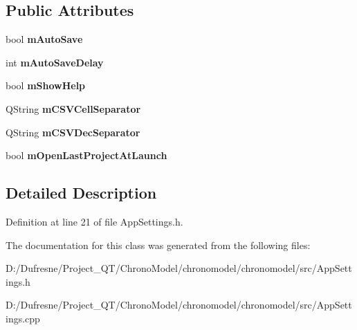 \subsection*{Public Attributes}
\begin{DoxyCompactItemize}
\item 
\hypertarget{class_app_settings_a34601f5b8a6e07a917e921245c207e21}{bool {\bfseries m\-Auto\-Save}}\label{class_app_settings_a34601f5b8a6e07a917e921245c207e21}

\item 
\hypertarget{class_app_settings_a32b8c1b9531b2c900bf53b9ee9daddb9}{int {\bfseries m\-Auto\-Save\-Delay}}\label{class_app_settings_a32b8c1b9531b2c900bf53b9ee9daddb9}

\item 
\hypertarget{class_app_settings_a5e0e34656a10ac3033f1c1024fbb42f9}{bool {\bfseries m\-Show\-Help}}\label{class_app_settings_a5e0e34656a10ac3033f1c1024fbb42f9}

\item 
\hypertarget{class_app_settings_a1bd0ecd508366a96991add8d87ed30ff}{Q\-String {\bfseries m\-C\-S\-V\-Cell\-Separator}}\label{class_app_settings_a1bd0ecd508366a96991add8d87ed30ff}

\item 
\hypertarget{class_app_settings_a311587646ae73730f453d4ee1d9c6df0}{Q\-String {\bfseries m\-C\-S\-V\-Dec\-Separator}}\label{class_app_settings_a311587646ae73730f453d4ee1d9c6df0}

\item 
\hypertarget{class_app_settings_a3c26dc616125e6a0a372b9766c008106}{bool {\bfseries m\-Open\-Last\-Project\-At\-Launch}}\label{class_app_settings_a3c26dc616125e6a0a372b9766c008106}

\end{DoxyCompactItemize}


\subsection{Detailed Description}


Definition at line 21 of file App\-Settings.\-h.



The documentation for this class was generated from the following files\-:\begin{DoxyCompactItemize}
\item 
D\-:/\-Dufresne/\-Project\-\_\-\-Q\-T/\-Chrono\-Model/chronomodel/chronomodel/src/App\-Settings.\-h\item 
D\-:/\-Dufresne/\-Project\-\_\-\-Q\-T/\-Chrono\-Model/chronomodel/chronomodel/src/App\-Settings.\-cpp\end{DoxyCompactItemize}
